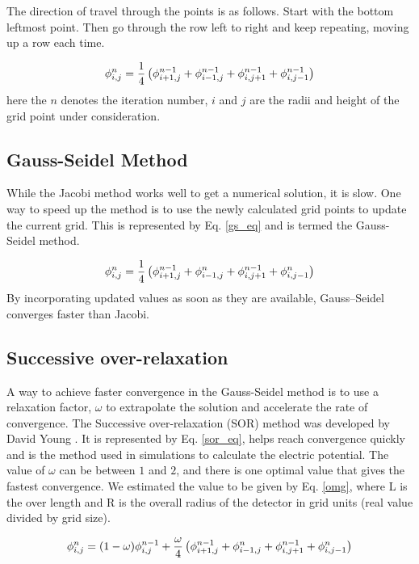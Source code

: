 The direction of travel through the points is as follows. Start with the bottom leftmost point. Then go through the row left to right and keep repeating, moving up a row each time.


\begin{equation}{\label{jacobi}}
 \phi_{i,j}^{n} = \frac{1}{4}  \left(\phi^{n-1}_{i+1,j} + \phi^{n-1}_{i-1,j} + \phi^{n-1}_{i,j+1} + \phi^{n-1}_{i,j-1} \right)
\end{equation}
here the $n$ denotes the iteration number, $i$ and $j$ are the radii and height of the grid point under consideration. 

\subsection*{Gauss-Seidel Method}

While the Jacobi method works well to get a numerical solution, it is slow. One way to speed up the method is to use the newly calculated grid points to update the current grid. This is represented by Eq. \ref{gs_eq} and is termed the Gauss-Seidel method.


\begin{equation}{\label{gs_eq}}
 \phi_{i,j}^{n} = \frac{1}{4}  \left(\phi^{n-1}_{i+1,j} + \phi^n_{i-1,j} + \phi^{n-1}_{i,j+1} + \phi^n_{i,j-1} \right)
\end{equation}
By incorporating updated values as soon as they are available, Gauss--Seidel converges faster than Jacobi.

\subsection*{Successive over-relaxation}

A way to achieve faster convergence in the Gauss-Seidel method is to use a relaxation factor, $\omega$ to extrapolate the solution and accelerate the rate of convergence. The Successive over-relaxation (SOR) method was developed by David Young \cite{Young1950}. It is  represented by Eq. \ref{sor_eq}, helps reach convergence quickly and is the method used in {\siggen} simulations to calculate the electric potential. The value of $\omega$ can be between $1$ and $2$, and there is one optimal value that gives the fastest convergence. We estimated the value to be given by Eq. \ref{omg}, where L is the over length and R is the overall radius of the detector in grid units (real value divided by grid size). 

\begin{equation}{\label{sor_eq}}
 \phi_{i,j}^{n} = (1-\omega)\phi^{n-1}_{i,j} + \frac{\omega}{4} \left(\phi^{n-1}_{i+1,j} + \phi^n_{i-1,j} + \phi^{n-1}_{i,j+1} + \phi^n_{i,j-1} \right)
\end{equation}

